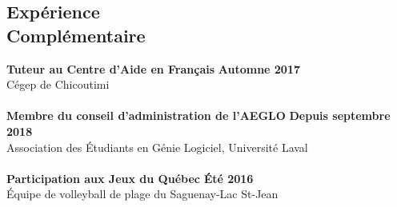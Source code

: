 \documentclass[margin,line]{resume}
\begin{document}
\begin{resume}
    \section{\mysidestyle Exp\'{e}rience\\Compl\'{e}mentaire}
    \textbf{Tuteur au Centre d'Aide en Fran\c{c}ais} \hfill \textbf{Automne 2017} \vspace{2mm}\\\vspace{1mm}%
    C\'{e}gep de Chicoutimi \\ \\
    \textbf{Membre du conseil d'administration de l'AEGLO} \hfill \textbf{Depuis septembre 2018} \vspace{2mm}\\\vspace{1mm}%
    Association des \'{E}tudiants en G\'{e}nie Logiciel, Universit\'{e} Laval \\ \\
    \textbf{Participation aux Jeux du Qu\'{e}bec} \hfill \textbf{\'{E}t\'{e} 2016} \vspace{2mm}\\\vspace{1mm}%
    \'{E}quipe de volleyball de plage du Saguenay-Lac St-Jean
    
    
    
\end{resume}
\end{document}
